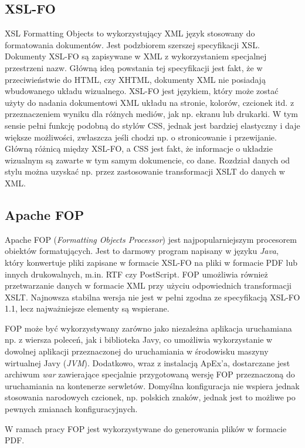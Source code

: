 \documentclass[11pt,a4paper]{article}
\begin{document}
\subsection{XSL-FO} \label{tools:xslfo}
XSL Formatting Objects to wykorzystujący XML język stosowany do formatowania dokumentów. Jest podzbiorem szerszej specyfikacji XSL. Dokumenty XSL-FO są zapisywane w XML z wykorzystaniem specjalnej przestrzeni nazw. Główną ideą powstania tej specyfikacji jest fakt, że w przeciwieństwie do HTML, czy XHTML, dokumenty XML nie posiadają wbudowanego układu wizualnego. XSL-FO jest językiem, który może zostać użyty do nadania dokumentowi XML układu na stronie, kolorów, czcionek itd. z przeznaczeniem wyniku dla różnych mediów, jak np. ekranu lub drukarki. W tym sensie pełni funkcję podobną do stylów CSS, jednak jest bardziej elastyczny i daje większe możliwości, zwłaszcza jeśli chodzi np. o stronicowanie i przewijanie. Główną różnicą między XSL-FO, a CSS jest fakt, że informacje o układzie wizualnym są zawarte w tym samym dokumencie, co dane. Rozdział danych od stylu można uzyskać np. przez zastosowanie transformacji XSLT do danych w XML.

\subsection{Apache FOP} \label{tools:fop}
Apache FOP (\emph{Formatting Objects Processor}) jest najpopularniejszym procesorem obiektów formatujących. Jest to darmowy program napisany w języku \emph{Java}, który konwertuje pliki zapisane w formacie XSL-FO na pliki w formacie PDF lub innych drukowalnych, m.in. RTF czy PostScript. FOP umożliwia również przetwarzanie danych w formacie XML przy użyciu odpowiednich transformacji XSLT. Najnowsza stabilna wersja nie jest w pełni zgodna ze specyfikacją XSL-FO 1.1, lecz najważniejsze elementy są wspierane.

FOP może być wykorzystywany zarówno jako niezależna aplikacja uruchamiana np. z wiersza poleceń, jak i biblioteka Javy, co umożliwia wykorzystanie w dowolnej aplikacji przeznaczonej do uruchamiania w środowisku maszyny wirtualnej Javy (\emph{JVM}). Dodatkowo, wraz z instalacją ApEx'a, dostarczane jest archiwum \emph{war} zawierające specjalnie przygotowaną wersję FOP przeznaczoną do uruchamiania na kontenerze serwletów. Domyślna konfiguracja nie wspiera jednak stosowania narodowych czcionek, np. polskich znaków, jednak jest to możliwe po pewnych zmianach konfiguracyjnych. 

W ramach pracy FOP jest wykorzystywane do generowania plików w formacie PDF.
\end{document}

